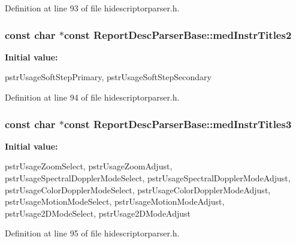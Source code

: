 \-Definition at line 93 of file hidescriptorparser.\-h.

\hypertarget{class_report_desc_parser_base_aee85293ab9a08f5e348fe339f7e4e7e9}{
\subsubsection[{med\-Instr\-Titles2}]{\setlength{\rightskip}{0pt plus 5cm}const char $\ast$const {\bf \-Report\-Desc\-Parser\-Base\-::med\-Instr\-Titles2}}}\label{class_report_desc_parser_base_aee85293ab9a08f5e348fe339f7e4e7e9}
{\bfseries \-Initial value\-:}
\begin{DoxyCode}
 {
        pstrUsageSoftStepPrimary,
        pstrUsageSoftStepSecondary
}
\end{DoxyCode}


\-Definition at line 94 of file hidescriptorparser.\-h.

\hypertarget{class_report_desc_parser_base_a986eebc1d44ff6c7b2779c584640bfa8}{
\subsubsection[{med\-Instr\-Titles3}]{\setlength{\rightskip}{0pt plus 5cm}const char $\ast$const {\bf \-Report\-Desc\-Parser\-Base\-::med\-Instr\-Titles3}}}\label{class_report_desc_parser_base_a986eebc1d44ff6c7b2779c584640bfa8}
{\bfseries \-Initial value\-:}
\begin{DoxyCode}
 {
        pstrUsageZoomSelect,
        pstrUsageZoomAdjust,
        pstrUsageSpectralDopplerModeSelect,
        pstrUsageSpectralDopplerModeAdjust,
        pstrUsageColorDopplerModeSelect,
        pstrUsageColorDopplerModeAdjust,
        pstrUsageMotionModeSelect,
        pstrUsageMotionModeAdjust,
        pstrUsage2DModeSelect,
        pstrUsage2DModeAdjust
}
\end{DoxyCode}


\-Definition at line 95 of file hidescriptorparser.\-h.

